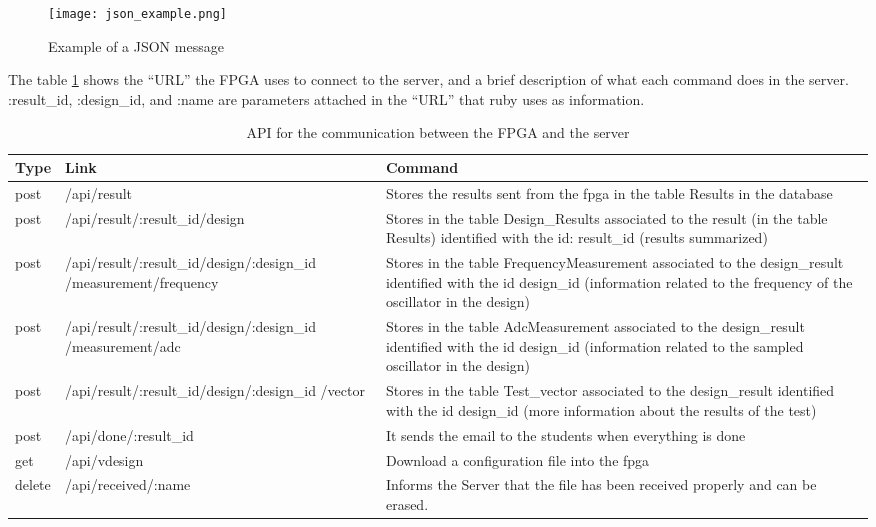 \begin{figure}[htb]
\centering
\texttt{[image: json\_example.png]}
\caption{Example of a JSON message}
\label{fig:Json_message}
\end{figure}

The table \ref{tab:api_server_fpga} shows the ``URL'' the FPGA uses to connect to the server, and a brief description of what each command does in the server. :result\_id, :design\_id,
and :name are parameters attached in the ``URL'' that ruby uses as information.

\begin{table}[h!]
\centering
    \begin{tabular}{ | l | p{7cm} | p{5cm}|}
    \hline
    Type & Link & Command   \\ \hline
    post & /api/result & Stores the results sent from the fpga in the table Results in the database\\ \hline
    post & /api/result/:result\_id/design & Stores in the table Design\_Results associated to the result (in the table Results) identified with the id: result\_id (results summarized)\\ \hline
    post & /api/result/:result\_id/design/:design\_id	/measurement/frequency & Stores in the table FrequencyMeasurement associated to the design\_result identified with the id design\_id (information related to the frequency of the oscillator in the design)\\ \hline
    post & /api/result/:result\_id/design/:design\_id	/measurement/adc & Stores in the table AdcMeasurement associated to the design\_result identified with the id design\_id (information related to the sampled oscillator in the design)  \\ \hline
    post & /api/result/:result\_id/design/:design\_id	/vector & Stores in the table Test\_vector associated to the design\_result identified with the id design\_id (more information about the results of the test)\\ \hline
    post & /api/done/:result\_id & It sends the email to the students when everything is done\\ \hline
    get & /api/vdesign & Download a configuration file into the fpga\\ \hline
    delete & /api/received/:name & Informs the Server that the file has been received properly and can be erased.\\ \hline
    \end{tabular}
    \caption{API for the communication between the FPGA and the server}
    \label{tab:api_server_fpga}
\end{table}

